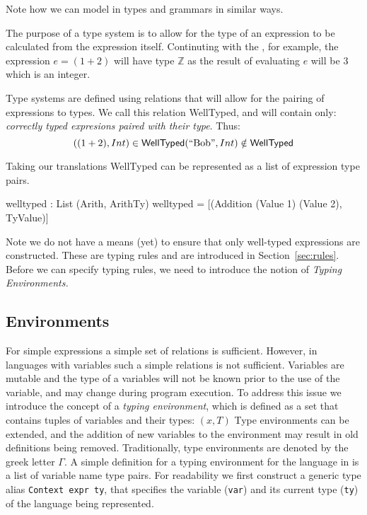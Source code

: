 \noindent
Note how we can model in \idris{} types and grammars in similar ways.

The purpose of a type system is to allow for the type of an expression to be calculated from the expression itself.
Continuting with the \allang{}, for example, the expression $e=(1 + 2)$ will have type $\mathbb{Z}$ as the result of evaluating $e$ will be $3$ which is an integer.

Type systems are defined using relations that will allow for the pairing of expressions to types.
We call this relation \textsf{WellTyped}, and will contain only: \emph{correctly typed expresions paired with their type}.
Thus:
\[
((1+2), Int)\in\mathsf{WellTyped}\\
(\text{``Bob''},Int)\notin\mathsf{WellTyped}
\]

Taking our \idris{} translations \textsf{WellTyped} can be represented as a list of expression type pairs.

\begin{code}
welltyped : List (Arith, ArithTy)
welltyped = [(Addition (Value 1) (Value 2), TyValue)]
\end{code}

Note we do not have a means (yet) to ensure that only well-typed expressions are constructed.
These are typing rules and are introduced in Section~\ref{sec:rules}.
Before we can specify typing rules, we need to introduce the notion of \emph{Typing Environments.}

\subsection{Environments}
\label{sec:type:env}

For simple expressions a simple set of relations is sufficient.
However, in languages with variables such a simple relations is not sufficient.
Variables are mutable and the type of a variables will not be known prior to the use of the variable, and may change during program execution.
To address this issue we introduce the concept of a \emph{typing environment}, which is defined as a set that contains tuples of variables and their types: $(x,T)$
Type environments can be extended, and the addition of new variables to the environment may result in old definitions being removed.
Traditionally, type environments are denoted by the greek letter $\Gamma$.
A simple definition for a typing environment for the \allang{} language in \idris{} is a list of variable name type pairs.
For readability we first construct a generic type alias \texttt{Context expr ty}, that specifies the variable  (\texttt{var}) and its current type (\texttt{ty}) of the language being represented.

